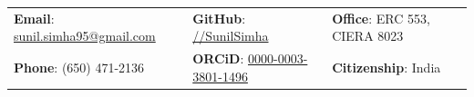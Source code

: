 \documentclass[letterpaper, 11pt]{article}
\begin{document}


\vspace{0.5cm} 
\begin{center}
\begin{tabular}{lll}
\textbf{Email}: \href{mailto:sunil.simha95@gmail.com}{sunil.simha95@gmail.com}      &
\hspace{0.35in} \textbf{GitHub}: \href{https://github.com/SunilSimha}{//SunilSimha}    &
\hspace{0.2in} 	\textbf{Office}: ERC 553, CIERA 8023 \\

\textbf{Phone}: (650) 471-2136   & 
\hspace{0.35in} \textbf{ORCiD}: \href{https://orcid.org/0000-0003-3801-1496}{0000-0003-3801-1496}   & 
\hspace{0.2in} \textbf{Citizenship}: India 
\end{tabular}
\end{center}


\setlength{\tabcolsep}{8pt}
\end{document}
